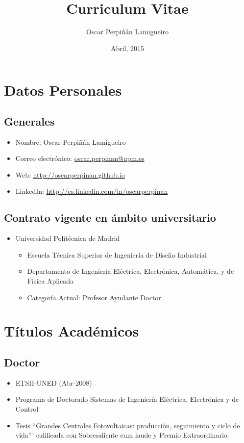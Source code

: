 \documentclass[article, a4paper]{memoir}
\author{Oscar Perpiñán Lamigueiro}
\date{Abril, 2015}
\title{Curriculum Vitae}
\begin{document}
\maketitle

\section{Datos Personales}
\label{sec-1}

\subsection{Generales}
\label{sec-1-1}

\begin{itemize}
\item Nombre: Oscar Perpiñán Lamigueiro
\item Correo electrónico: \href{mailto:oscar.perpinan@upm.es}{oscar.perpinan@upm.es}
\item Web: \url{http://oscarperpinan.github.io}
\item LinkedIn: \url{http://es.linkedin.com/in/oscarperpinan}
\end{itemize}

\subsection{Contrato vigente en ámbito universitario}
\label{sec-1-2}

\begin{itemize}
\item Universidad Politécnica de Madrid
\begin{itemize}
\item Escuela Técnica Superior de Ingeniería de Diseño Industrial
\item Departamento de Ingeniería Eléctrica, Electrónica, Automática, y de Física Aplicada
\item Categoría Actual: Profesor Ayudante Doctor
\end{itemize}
\end{itemize}


\section{Títulos Académicos}
\label{sec-2}

\subsection{Doctor}
\label{sec-2-1}
\begin{itemize}
\item ETSII-UNED (Abr-2008)
\item Programa de Doctorado \guillemotleft{}Sistemas de Ingeniería Eléctrica, Electrónica y de Control\guillemotright{}
\item Tesis ``Grandes Centrales Fotovoltaicas: producción, seguimiento y ciclo de vida''' calificada con Sobresaliente cum laude y Premio Extraordinario.
\end{itemize}
\end{document}
